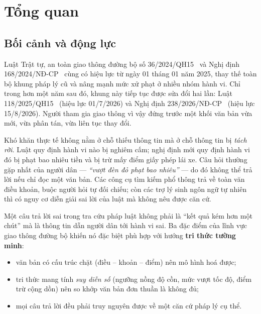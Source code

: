 \section{Tổng quan}
\label{sec:tong-quan}

\subsection{Bối cảnh và động lực}

Luật Trật tự, an toàn giao thông đường bộ số 36/2024/QH15~\cite{luat36} và Nghị định
168/2024/NĐ-CP~\cite{nd168} cùng có hiệu lực từ ngày 01 tháng 01 năm 2025, thay thế toàn bộ
khung pháp lý cũ và nâng mạnh mức xử phạt ở nhiều nhóm hành vi. Chỉ trong hơn một năm sau
đó, khung này tiếp tục được sửa đổi hai lần: Luật 118/2025/QH15~\cite{luat118} (hiệu lực
01/7/2026) và Nghị định 238/2026/NĐ-CP~\cite{nd238} (hiệu lực 15/8/2026). Người tham gia giao
thông vì vậy đứng trước một khối văn bản vừa mới, vừa phân tán, vừa liên tục thay đổi.

Khó khăn thực tế không nằm ở chỗ thiếu thông tin mà ở chỗ thông tin bị \emph{tách rời}.
Luật quy định hành vi nào bị nghiêm cấm; nghị định mới quy định hành vi đó bị phạt bao
nhiêu tiền và bị trừ mấy điểm giấy phép lái xe. Câu hỏi thường gặp nhất của người dân ---
\emph{``vượt đèn đỏ phạt bao nhiêu''} --- do đó không thể trả lời nếu chỉ đọc một văn bản.
Các công cụ tìm kiếm phổ thông trả về toàn văn điều khoản, buộc người hỏi tự đối chiếu;
còn các trợ lý sinh ngôn ngữ tự nhiên thì có nguy cơ diễn giải sai lời của luật mà không
nêu được căn cứ.

Một câu trả lời sai trong tra cứu pháp luật không phải là ``kết quả kém hơn một chút'' mà
là thông tin dẫn người dân tới hành vi sai. Ba đặc điểm của lĩnh vực giao thông đường bộ
khiến nó đặc biệt phù hợp với hướng \textbf{tri thức tường minh}:
\begin{itemize}
  \item văn bản có cấu trúc chặt (điều -- khoản -- điểm) nên mô hình hoá được;
  \item tri thức mang tính \emph{suy diễn số} (ngưỡng nồng độ cồn, mức vượt tốc độ, điểm
        trừ cộng dồn) nên so khớp văn bản đơn thuần là không đủ;
  \item mọi câu trả lời đều phải truy nguyên được về một căn cứ pháp lý cụ thể.
\end{itemize}

